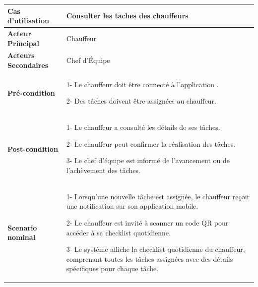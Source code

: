 \begin{table}[H]
  \centering
  \renewcommand{\arraystretch}{1} %
  \begin{tabular}{|p{4cm}|p{9cm}|}
    \hline
    \textbf{Cas d'utilisation}    & Consulter les taches des chauffeurs                                                                                 \\
    \hline
    \textbf{Acteur Principal }    & Chauffeur                                                                                                           \\
    \hline
    \textbf{Acteurs Secondaires } & Chef d’Équipe                                                                                                       \\
    \hline
    \textbf{Pré-condition}        & 1- Le chauffeur doit être connecté à l'application .\newline

    2-  Des tâches doivent être assignées au chauffeur.                                                                                                 \\
    \hline
    \textbf{Post-condition}       & 1- Le chauffeur a consulté les détails de ses tâches.\newline

    2- Le chauffeur peut confirmer la réalisation des tâches.\newline

    3- Le chef d’équipe est informé de l’avancement ou de l’achèvement des tâches.                                                                      \\

    \hline
    \textbf{Scenario nominal}     & 1- Lorsqu’une nouvelle tâche est assignée, le chauffeur reçoit une notification sur son application mobile.
    \newline


    2- Le chauffeur est invité à scanner un code QR pour accéder à sa checklist quotidienne.\newline

    3- Le système affiche la checklist quotidienne du chauffeur, comprenant toutes les tâches assignées avec des détails spécifiques pour chaque tâche. \\
  \end{tabular}

\end{table}

